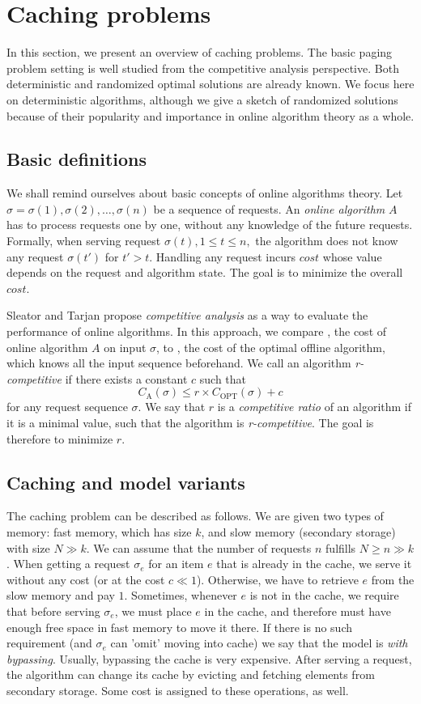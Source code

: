 \section{Caching problems}
\label{caching_problems}
In this section, we present an overview of caching problems. The basic paging 
problem setting is well studied from the competitive analysis perspective. 
Both deterministic and randomized optimal solutions are already known. We focus 
here on deterministic algorithms, although we give a sketch of randomized solutions 
because of their popularity and importance in online algorithm theory as a 
whole. 
\subsection{Basic definitions}
We shall remind ourselves about basic concepts of online algorithms theory. 
Let $\sigma = \sigma(1), \sigma(2), \ldots, \sigma(n)$ be a sequence of 
requests. An \textit{online algorithm} $A$ has to process requests one by one, 
without any knowledge of the future requests. Formally, when 
serving request 
$\sigma(t), 1 \leq t \leq n,$ the algorithm does not know any request 
$\sigma(t')$ for $t'>t$. Handling any request incurs $cost$ whose value  
depends on the request and algorithm state. The goal is to minimize the overall 
$cost$.

Sleator and Tarjan \cite{tarjan} propose
\textit{competitive analysis} as a way to evaluate the performance of online 
algorithms. In this approach, we compare , the cost of online algorithm 
$A$ on input $\sigma$, to , the cost of the optimal offline algorithm, 
which knows all the input sequence beforehand. We call an algorithm 
\textit{r-competitive} if there exists a constant $c$ such that
$$C_{\mathrm{A}}(\sigma) \leq r \times C_{\mathrm{OPT}}(\sigma) + c$$
for any request sequence $\sigma$. We say that $r$ is a \textit{competitive ratio}
of an algorithm if it is a minimal value, such that the algorithm is 
\textit{r-competitive}. The goal is therefore to minimize $r$.

\subsection{Caching and model variants}
The caching problem can be described as follows. We are given two types of memory: 
fast memory, which has size $k$, and slow memory (secondary storage) with size $N 
\gg k$. We can 
assume that the number of requests $n$ fulfills $N \geq n \gg k$. When getting a 
request $\sigma_{e}$ for an item $e$ that is already in the cache, we serve it 
without any cost (or at the cost $c \ll 1$). 
Otherwise, we have to retrieve $e$ from the slow memory and pay 
$1$. Sometimes, whenever $e$ is not in the cache, we require that before 
serving $\sigma_{e}$, we must place $e$ in the cache, and therefore must have 
enough free space in fast memory to move it there. If there is no such requirement 
(and $\sigma_{e}$ can 'omit' moving into cache) we say that the model is 
\textit{with bypassing}. Usually, bypassing the cache is very expensive. After serving 
a request, the algorithm can change its cache by evicting and fetching elements 
from secondary storage. Some cost is assigned to these operations, as well.

